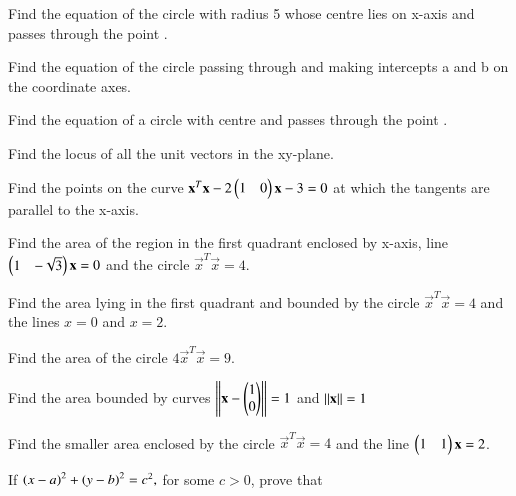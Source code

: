 
\item Find the equation of the circle with radius 5 whose centre lies on x-axis and passes through the point .
\\
\solution

\item Find the equation of the circle passing through  and making intercepts a and b on the coordinate axes.
\item Find the equation of a circle with centre  and passes through the point . 
\item Find the locus of all the unit vectors in the xy-plane.
%
\item Find the points on the curve $\mathbf{x}^T\mathbf{x}-2\begin{pmatrix}1 & 0\end{pmatrix}\mathbf{x} -3 =0$  at which the tangents are parallel to the x-axis.
%
\item  Find the area of the region in the first quadrant enclosed by x-axis, line $\begin{pmatrix}1 & -\sqrt{3}\end{pmatrix}\mathbf{x} =0$ and the circle $\vec{x}^T\vec{x}=4$.
%
\item Find the area lying in the first quadrant and bounded by the circle $\vec{x}^T\vec{x}=4$ and the lines $x = 0$ and $x = 2$.
%
\item Find the area of the circle $4\vec{x}^T\vec{x}=9$.
\item  Find the area bounded by curves $\left\lVert\mathbf{x}-\begin{pmatrix}1\\0\end{pmatrix}\right\rVert = 1$ and $\left\lVert\mathbf{x}\right\rVert=1$
\item Find the smaller area enclosed by the circle $\vec{x}^T\vec{x}=4$ and the line $\begin{pmatrix}1 & 1\end{pmatrix}\mathbf{x} = 2$.
%
\item If 
$
\left(x-a\right)^2+\left(y-b\right)^2 = c^2,
$
for some $c > 0$, prove that 
